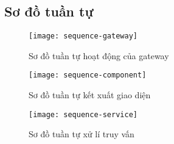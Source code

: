 \subsection{Sơ đồ tuần tự}


\begin{figure}[h!]
	\begin{center}	
		\texttt{[image: sequence-gateway]}
		\caption{Sơ đồ tuần tự hoạt động của gateway}
	\end{center}
\end{figure}


\begin{figure}[h!]
	\begin{center}	
		\texttt{[image: sequence-component]}
		\caption{Sơ đồ tuần tự kết xuất giao diện}
	\end{center}
\end{figure}

\begin{figure}[h!]
	\begin{center}	
		\texttt{[image: sequence-service]}
		\caption{Sơ đồ tuần tự xử lí truy vấn}
	\end{center}
\end{figure}

